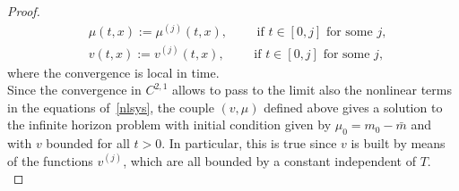 \documentclass[10pt,a4paper,nouppercase,nowrite]{article}
\numberwithin{equation}{section}
\newcommand{\TODO}[1]{{\color{magenta}{#1}}}
\newcommand{\T}{\mathbb{T}}
\theoremstyle{definition}
\begin{document}
\begin{proof}
	\begin{align*}
		&\mu(t,x):=\mu^{(j)}(t,x), \qquad \text{ if } t \in [0,j] \text{ for some }j, \\
		&v(t,x):=v^{(j)}(t,x), \qquad \text{ if } t \in [0,j] \text{ for some }j,
	\end{align*}
	where the convergence is local in time. \\
	Since the convergence in $C^{2,1}$ allows to pass to the limit also the nonlinear terms in the equations of~\eqref{nlsys}, the couple $(v,\mu)$ defined above gives a solution to the infinite horizon problem with initial condition given by $\mu_0=m_0 - \bar m$ and with $v$ bounded for all $t > 0$. In particular, this is true since $v$ is built by means of the functions $v^{(j)}$, which are all bounded by a constant independent of $T$. \\
%	

\end{proof}
\end{document}
